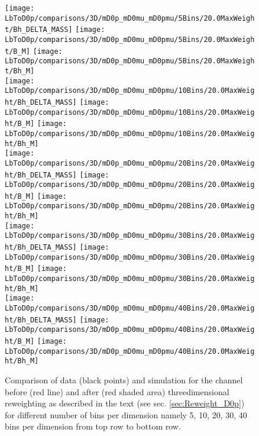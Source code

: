 \begin{figure}[tb]
	\centering
	\texttt{[image: LbToD0p/comparisons/3D/mD0p\_mD0mu\_mD0pmu/5Bins/20.0MaxWeight/Bh\_DELTA\_MASS]}
	\texttt{[image: LbToD0p/comparisons/3D/mD0p\_mD0mu\_mD0pmu/5Bins/20.0MaxWeight/B\_M]}
	\texttt{[image: LbToD0p/comparisons/3D/mD0p\_mD0mu\_mD0pmu/5Bins/20.0MaxWeight/Bh\_M]} \\
	\texttt{[image: LbToD0p/comparisons/3D/mD0p\_mD0mu\_mD0pmu/10Bins/20.0MaxWeight/Bh\_DELTA\_MASS]}
	\texttt{[image: LbToD0p/comparisons/3D/mD0p\_mD0mu\_mD0pmu/10Bins/20.0MaxWeight/B\_M]}
	\texttt{[image: LbToD0p/comparisons/3D/mD0p\_mD0mu\_mD0pmu/10Bins/20.0MaxWeight/Bh\_M]} \\
	\texttt{[image: LbToD0p/comparisons/3D/mD0p\_mD0mu\_mD0pmu/20Bins/20.0MaxWeight/Bh\_DELTA\_MASS]}
	\texttt{[image: LbToD0p/comparisons/3D/mD0p\_mD0mu\_mD0pmu/20Bins/20.0MaxWeight/B\_M]}
	\texttt{[image: LbToD0p/comparisons/3D/mD0p\_mD0mu\_mD0pmu/20Bins/20.0MaxWeight/Bh\_M]} \\
	\texttt{[image: LbToD0p/comparisons/3D/mD0p\_mD0mu\_mD0pmu/30Bins/20.0MaxWeight/Bh\_DELTA\_MASS]}
	\texttt{[image: LbToD0p/comparisons/3D/mD0p\_mD0mu\_mD0pmu/30Bins/20.0MaxWeight/B\_M]}
	\texttt{[image: LbToD0p/comparisons/3D/mD0p\_mD0mu\_mD0pmu/30Bins/20.0MaxWeight/Bh\_M]} \\
	\texttt{[image: LbToD0p/comparisons/3D/mD0p\_mD0mu\_mD0pmu/40Bins/20.0MaxWeight/Bh\_DELTA\_MASS]}
	\texttt{[image: LbToD0p/comparisons/3D/mD0p\_mD0mu\_mD0pmu/40Bins/20.0MaxWeight/B\_M]}
	\texttt{[image: LbToD0p/comparisons/3D/mD0p\_mD0mu\_mD0pmu/40Bins/20.0MaxWeight/Bh\_M]} 
	\caption{Comparison of data (black points) and simulation for the \LbToDpmunuX channel before (red line) and after (red shaded area) threedimensional reweighting as described in the text (see sec. \ref{sec:Reweight_D0p}) for different number of bins per dimension namely 5, 10, 20, 30, 40 bins per dimension from top row to bottom row.}
	\label{fig:reweighting_nbins}
\end{figure}

